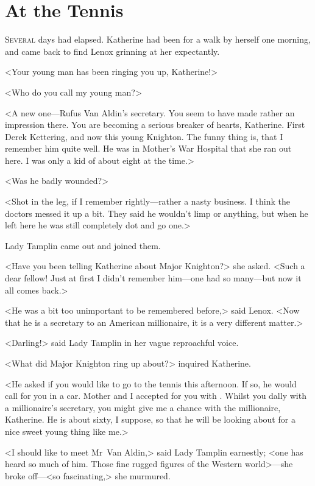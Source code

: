 \chapter{At the Tennis}



\lettrine{S}{everal} days had elapsed. Katherine had been for a walk by herself one morning, and came back to find Lenox grinning at her expectantly.

\zz
<Your young man has been ringing you up, Katherine!>

<Who do you call my young man?>

<A new one—Rufus Van Aldin's secretary. You seem to have made rather an impression there. You are becoming a serious breaker of hearts, Katherine. First Derek Kettering, and now this young Knighton. The funny thing is, that I remember him quite well. He was in Mother's War Hospital that she ran out here. I was only a kid of about eight at the time.>

<Was he badly wounded?>

<Shot in the leg, if I remember rightly—rather a nasty business. I think the doctors messed it up a bit. They said he wouldn't limp or anything, but when he left here he was still completely dot and go one.>

Lady Tamplin came out and joined them.

<Have you been telling Katherine about Major Knighton?> she asked. <Such a dear fellow! Just at first I didn't remember him—one had so many—but now it all comes back.>

<He was a bit too unimportant to be remembered before,> said Lenox. <Now that he is a secretary to an American millionaire, it is a very different matter.>

<Darling!> said Lady Tamplin in her vague reproachful voice.

<What did Major Knighton ring up about?> inquired Katherine.

<He asked if you would like to go to the tennis this afternoon. If so, he would call for you in a car. Mother and I accepted for you with . Whilst you dally with a millionaire's secretary, you might give me a chance with the millionaire, Katherine. He is about sixty, I suppose, so that he will be looking about for a nice sweet young thing like me.>

<I should like to meet Mr~Van Aldin,> said Lady Tamplin earnestly; <one has heard so much of him. Those fine rugged figures of the Western world>—she broke off—<so fascinating,> she murmured.

